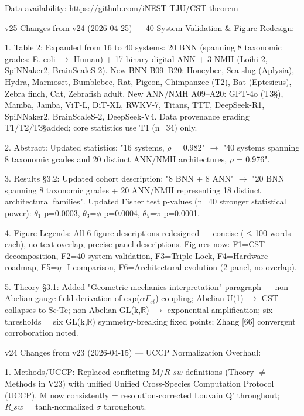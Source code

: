 \documentclass[a4paper,12pt]{article}
\providecommand{\textsubscript}[1]{\ensuremath{_{\text{#1}}}}
\begin{document}
Data availability: https://github.com/iNEST-TJU/CST-theorem

v25 Changes from v24 (2026-04-25) --- 40-System Validation \& Figure Redesign:

1.
Table 2: Expanded from 16 to 40 systems: 20 BNN (spanning 8 taxonomic grades: E. coli $\rightarrow$ Human) + 17 binary-digital ANN + 3 NMH (Loihi-2, SpiNNaker2, BrainScaleS-2).
New BNN B09--B20: Honeybee, Sea slug (Aplysia), Hydra, Marmoset, Bumblebee, Rat, Pigeon, Chimpanzee (T2\dag), Bat (Eptesicus), Zebra finch, Cat, Zebrafish adult.
New ANN/NMH A09--A20: GPT-4o (T3\S), Mamba, Jamba, ViT-L, DiT-XL, RWKV-7, Titans, TTT, DeepSeek-R1, SpiNNaker2, BrainScaleS-2, DeepSeek-V4.
Data provenance grading T1/T2\dag/T3\S added; core statistics use T1 (n=34) only.

2. Abstract: Updated statistics: "16 systems, $\rho$ = 0.982" $\rightarrow$ "40 systems spanning 8 taxonomic grades and 20 distinct ANN/NMH architectures, $\rho$ = 0.976".

3. Results \S3.2: Updated cohort description: "8 BNN + 8 ANN" $\rightarrow$ "20 BNN spanning 8 taxonomic grades + 20 ANN/NMH representing 18 distinct architectural families". Updated Fisher test p-values (n=40 stronger statistical power): $\theta$\textsubscript{1} p=0.0003, $\theta$\textsubscript{3}=$\phi$ p=0.0004, $\theta$\textsubscript{5}=$\pi$ p=0.0001.

4. Figure Legends: All 6 figure descriptions redesigned --- concise ($\leq$100 words each), no text overlap, precise panel descriptions. Figures now: F1=CST decomposition, F2=40-system validation, F3=Triple Lock, F4=Hardware roadmap, F5=$\eta$_I comparison, F6=Architectural evolution (2-panel, no overlap).

5. Theory \S3.1: Added "Geometric mechanics interpretation" paragraph --- non-Abelian gauge field derivation of exp($\alpha$\cdot$\Gamma_{st}$) coupling; Abelian U(1) $\rightarrow$ CST collapses to Sc$\cdot$Tc; non-Abelian GL(k,$\mathbb{R}$) $\rightarrow$ exponential amplification; six thresholds = six GL(k,$\mathbb{R}$) symmetry-breaking fixed points; Zhang [66] convergent corroboration noted.

v24 Changes from v23 (2026-04-15) --- UCCP Normalization Overhaul:

1. Methods/UCCP: Replaced conflicting M/$R\_{sw}$ definitions (Theory $\neq$ Methods in V23) with unified Unified Cross-Species Computation Protocol (UCCP). M now consistently = resolution-corrected Louvain Q' throughout; $R\_{sw}$ = tanh-normalized $\sigma$ throughout.
\end{document}
